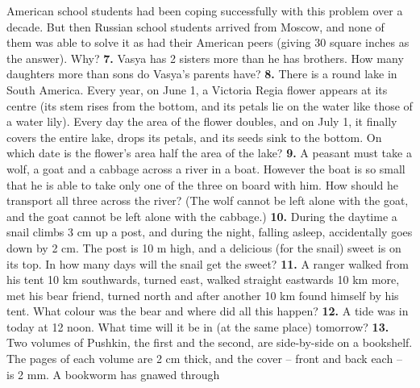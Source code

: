 \documentclass[12pt]{article}  %
\begin{document}
American school students had been coping successfully with this problem over a decade.
But then Russian school students arrived from Moscow, and none of them was able to solve it as had their American peers
(giving 30 square inches as the answer). Why? 
\newline\newline\quad
{\bf 7.} Vasya has 2 sisters more than he has brothers. How many daughters more than sons do Vasya's parents have?
\newline\newline\quad
{\bf 8.} There is a round lake in South America. Every year, on June 1, a Victoria Regia flower appears at its
centre (its stem rises from the bottom, and its petals lie on the water like those of a water lily). Every day
the area of the flower doubles, and on July 1, it finally covers the entire lake, drops its petals, and its seeds
sink to the bottom. On which date is the flower's area half the area of the lake?    
\newline\newline\quad
{\bf 9.} A peasant must take a wolf, a goat and a cabbage across a river in a boat. However the boat is so small that
he is able to take only one of the three on board with him. How should he transport all three across
the river? (The wolf cannot be left alone with the goat, and the goat cannot be left alone with the cabbage.)
\newline\newline\quad
{\bf 10.} During the daytime a snail climbs 3 cm up a post, and during the night, falling asleep, accidentally
goes down by 2 cm. The post is 10 m high, and a delicious (for the snail) sweet is on its top.
In how many days will the snail get the sweet?
\newline\newline\quad
{\bf 11.} A ranger walked from his tent 10 km southwards, turned east, walked straight eastwards 10 km more,
met his bear friend, turned north and after another 10 km found himself by his tent. What colour was the bear
and where did all this happen?
\newline\newline\quad
{\bf 12.} A tide was in today at 12 noon. What time will it be in (at the same place) tomorrow?
\newline\newline\quad
{\bf 13.} Two volumes of Pushkin, the first and the second, are side-by-side on a bookshelf. The pages of each
volume are 2 cm thick, and the cover -- front and back each -- is 2 mm. A bookworm has gnawed through
\end{document}
